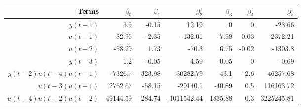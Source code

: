 \begin{tabular}{rrrrrrr}
Terms & $\beta_0$ & $\beta_1$ & $\beta_2$ & $\beta_3$ & $\beta_4$ & $\beta_5$ \\ 
\hline 
$y(t-1)$ & 3.9 & -0.15 & 12.19 & 0 & 0 & -23.66 \\ 
$u(t-1)$ & 82.96 & -2.35 & -132.01 & -7.98 & 0.03 & 2372.21 \\ 
$u(t-2)$ & -58.29 & 1.73 & -70.3 & 6.75 & -0.02 & -1303.8 \\ 
$y(t-3)$ & 1.2 & -0.05 & 4.59 & -0.05 & 0 & -0.69 \\ 
$y(t-2)u(t-4)u(t-1)$ & -7326.7 & 323.98 & -30282.79 & 43.1 & -2.6 & 46257.68 \\ 
$u(t-3)u(t-1)$ & 2762.67 & -58.15 & -29140.1 & -40.89 & 0.5 & 116163.72 \\ 
$u(t-4)u(t-2)u(t-2)$ & 49144.59 & -284.74 & -1011542.44 & 1835.88 & 0.3 & 3225245.81 \\ 
\hline 
\end{tabular}